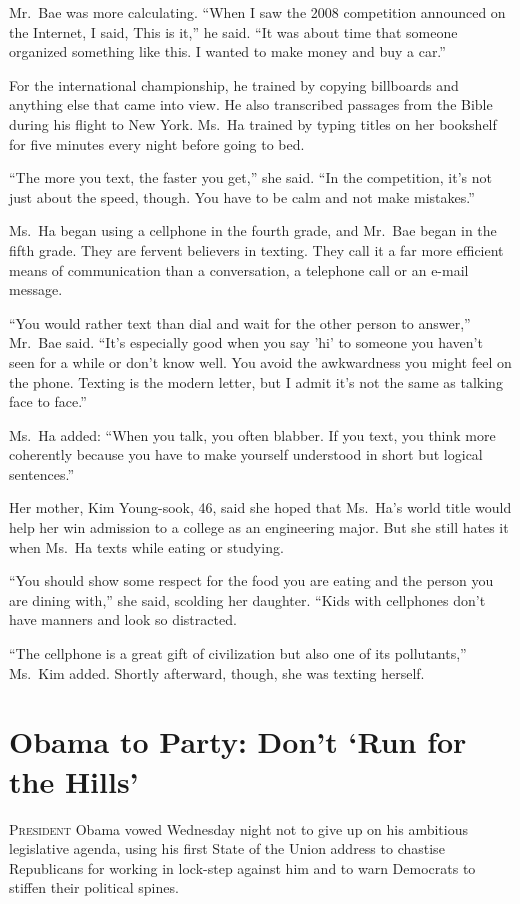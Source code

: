 ﻿\documentclass[12pt]{article}
\begin{document}
Mr.~Bae was more calculating. ``When I saw the 2008 competition announced on the Internet, I said,
This is it,'' he said. ``It was about time that someone organized something like this. I wanted to
make money and buy a car.''

For the international championship, he trained by copying billboards and anything else that came
into view. He also transcribed passages from the Bible during his flight to New York. Ms.~Ha trained
by typing titles on her bookshelf for five minutes every night before going to bed.

``The more you text, the faster you get,'' she said. ``In the competition, it's not just about the
speed, though. You have to be calm and not make mistakes.''

Ms.~Ha began using a cellphone in the fourth grade, and Mr.~Bae began in the fifth grade. They are
fervent believers in texting. They call it a far more efficient means of communication than a
conversation, a telephone call or an e-mail message.

``You would rather text than dial and wait for the other person to answer,'' Mr.~Bae said. ``It's
especially good when you say 'hi' to someone you haven't seen for a while or don't know well. You
avoid the awkwardness you might feel on the phone. Texting is the modern letter, but I admit it's
not the same as talking face to face.''

Ms.~Ha added: ``When you talk, you often blabber. If you text, you think more coherently because you
have to make yourself understood in short but logical sentences.''

Her mother, Kim Young-sook, 46, said she hoped that Ms.~Ha's world title would help her win
admission to a college as an engineering major. But she still hates it when Ms.~Ha texts while
eating or studying.

``You should show some respect for the food you are eating and the person you are dining with,'' she
said, scolding her daughter. ``Kids with cellphones don't have manners and look so distracted.

``The cellphone is a great gift of civilization but also one of its pollutants,'' Ms.~Kim added.
Shortly afterward, though, she was texting herself.

\section{Obama to Party: Don't `Run for the Hills'}

\lettrine{P}{resident} Obama vowed Wednesday night not to give up on his
ambitious legislative agenda, using his first State of the Union address to chastise Republicans for
working in lock-step against him and to warn Democrats to stiffen their political spines.
\end{document}
